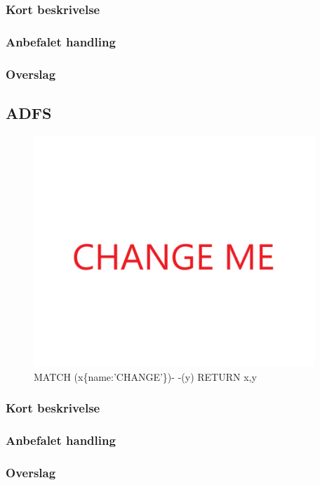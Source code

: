 \documentclass{article}
\begin{document}
\subsubsection{Kort beskrivelse}
\subsubsection{Anbefalet handling}
\subsubsection{Overslag}
\subsection{ADFS}
\begin{figure}[h]
\includegraphics[width=300pt]{CHANGE.PNG}
\caption{MATCH (x\{name:'CHANGE'\})- -(y) RETURN x,y}
\end{figure}
\subsubsection{Kort beskrivelse}
\subsubsection{Anbefalet handling}
\subsubsection{Overslag}
\end{document}
